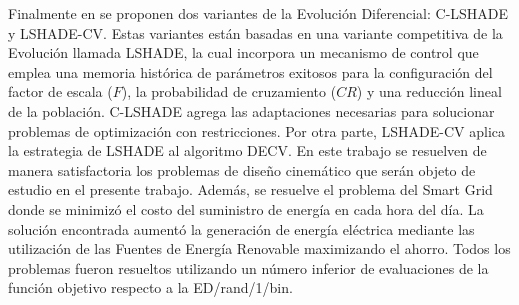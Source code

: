 Finalmente en \cite{zapata_zapata_control_2017}  se proponen dos variantes de la Evolución Diferencial: C-LSHADE y  LSHADE-CV. Estas variantes están basadas en una variante competitiva de la Evolución llamada LSHADE, la cual incorpora un mecanismo de control que emplea una memoria histórica de parámetros exitosos para la configuración del factor de escala ($F$), la probabilidad de cruzamiento ($CR$) y una reducción lineal de la población.  C-LSHADE agrega las adaptaciones necesarias para solucionar problemas de optimización con restricciones. Por otra parte, LSHADE-CV aplica la estrategia de LSHADE al algoritmo DECV. En este trabajo se resuelven de manera satisfactoria los problemas de diseño cinemático que serán objeto de estudio en el presente trabajo. Además, se resuelve el problema del Smart Grid donde se minimizó el costo del suministro de energía en cada hora del día. La solución encontrada aumentó la generación de energía eléctrica mediante las utilización de las Fuentes de Energía Renovable maximizando el ahorro. Todos los problemas fueron resueltos utilizando un número inferior de evaluaciones de la función objetivo respecto a la ED/rand/1/bin. 
  
